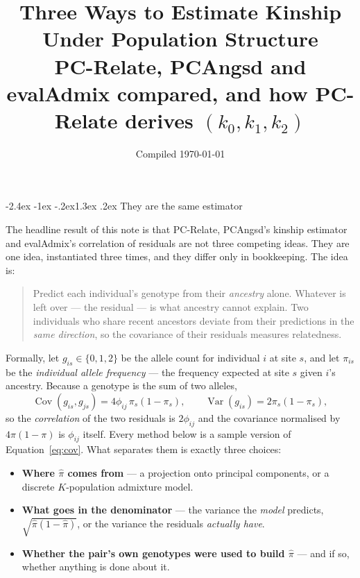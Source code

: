\documentclass[10pt,a4paper]{article}
\title{\vspace{-1.4cm}\color{hdr}\bfseries Three Ways to Estimate Kinship Under Population Structure\\[2pt]
\large\mdseries\color{black} PC-Relate, PCAngsd and evalAdmix compared,
and how PC-Relate derives $(k_0,k_1,k_2)$}
\author{}
\date{\small Compiled \today}
\makeatletter
\renewcommand\section{\@startsection{section}{1}{\z@}%
  {-2.4ex \@plus -1ex \@minus -.2ex}{1.3ex \@plus.2ex}%
  {\normalfont\large\bfseries\color{hdr}}}
\newenvironment{tightitem}{%
  \begin{itemize}\setlength{\itemsep}{1pt}\setlength{\parskip}{0pt}%
  \setlength{\topsep}{3pt}\setlength{\parsep}{0pt}}{\end{itemize}}
\makeatother
\begin{document}
\maketitle
\vspace{-1.1cm}

\section{They are the same estimator}

The headline result of this note is that PC-Relate, PCAngsd's kinship estimator and evalAdmix's correlation
of residuals are not three competing ideas. They are one idea, instantiated three times, and they differ only
in bookkeeping. The idea is:

\begin{quote}
Predict each individual's genotype from their \emph{ancestry} alone. Whatever is left over --- the residual
--- is what ancestry cannot explain. Two individuals who share recent ancestors deviate from their
predictions in the \emph{same direction}, so the covariance of their residuals measures relatedness.
\end{quote}

Formally, let $g_{is}\in\{0,1,2\}$ be the allele count for individual $i$ at site $s$, and let
$\pi_{is}$ be the \emph{individual allele frequency} --- the frequency expected at site $s$ given $i$'s
ancestry. Because a genotype is the sum of two alleles,
\begin{equation}
\operatorname{Cov}(g_{is},g_{js}) = 4\phi_{ij}\,\pi_s(1-\pi_s),
\qquad
\operatorname{Var}(g_{is}) = 2\pi_s(1-\pi_s),
\label{eq:cov}
\end{equation}
so the \emph{correlation} of the two residuals is $2\phi_{ij}$ and the covariance normalised by
$4\pi(1-\pi)$ is $\phi_{ij}$ itself. Every method below is a sample version of
Equation~\eqref{eq:cov}. What separates them is exactly three choices:

\begin{tightitem}
  \item[\textbf{(i)}] \textbf{Where $\hat\pi$ comes from} --- a projection onto principal components,
  or a discrete $K$-population admixture model.
  \item[\textbf{(ii)}] \textbf{What goes in the denominator} --- the variance the \emph{model} predicts,
  $\sqrt{\hat\pi(1-\hat\pi)}$, or the variance the residuals \emph{actually have}.
  \item[\textbf{(iii)}] \textbf{Whether the pair's own genotypes were used to build $\hat\pi$} --- and if so,
  whether anything is done about it.
\end{tightitem}
\end{document}
